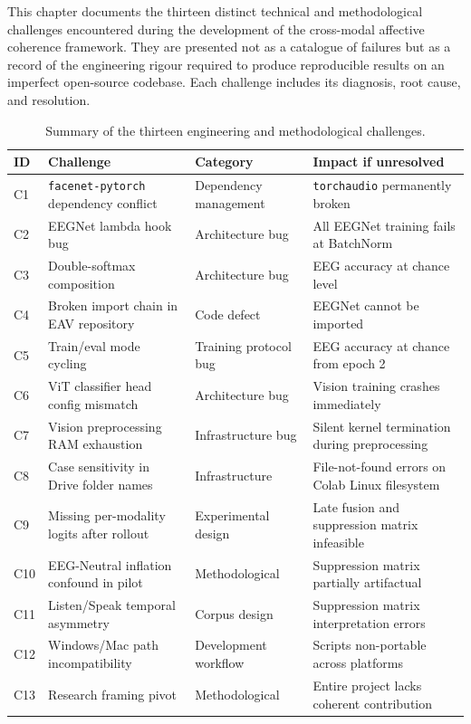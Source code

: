 This chapter documents the thirteen distinct technical and methodological challenges encountered during the development of the cross-modal affective coherence framework. They are presented not as a catalogue of failures but as a record of the engineering rigour required to produce reproducible results on an imperfect open-source codebase. Each challenge includes its diagnosis, root cause, and resolution.

\begin{table}[htbp]
\centering
\scriptsize
\caption{Summary of the thirteen engineering and methodological challenges.}
\label{tab:engineering_challenges}
\begin{tabular}{p{1.0cm} p{4.7cm} p{3.2cm} p{4.2cm}}
\hline
\textbf{ID} & \textbf{Challenge} & \textbf{Category} & \textbf{Impact if unresolved} \\
\hline
C1 & \texttt{facenet-pytorch} dependency conflict & Dependency management & \texttt{torchaudio} permanently broken \\
C2 & EEGNet lambda hook bug & Architecture bug & All EEGNet training fails at BatchNorm \\
C3 & Double-softmax composition & Architecture bug & EEG accuracy at chance level \\
C4 & Broken import chain in EAV repository & Code defect & EEGNet cannot be imported \\
C5 & Train/eval mode cycling & Training protocol bug & EEG accuracy at chance from epoch 2 \\
C6 & ViT classifier head config mismatch & Architecture bug & Vision training crashes immediately \\
C7 & Vision preprocessing RAM exhaustion & Infrastructure bug & Silent kernel termination during preprocessing \\
C8 & Case sensitivity in Drive folder names & Infrastructure & File-not-found errors on Colab Linux filesystem \\
C9 & Missing per-modality logits after rollout & Experimental design & Late fusion and suppression matrix infeasible \\
C10 & EEG-Neutral inflation confound in pilot & Methodological & Suppression matrix partially artifactual \\
C11 & Listen/Speak temporal asymmetry & Corpus design & Suppression matrix interpretation errors \\
C12 & Windows/Mac path incompatibility & Development workflow & Scripts non-portable across platforms \\
C13 & Research framing pivot & Methodological & Entire project lacks coherent contribution \\
\hline
\end{tabular}
\end{table}

